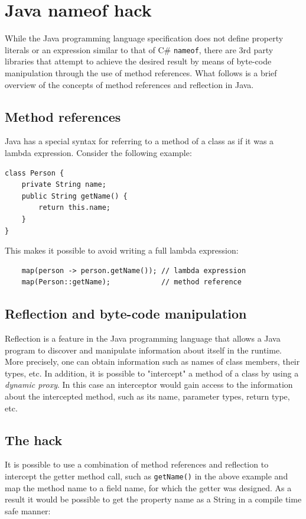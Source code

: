 \section{Java nameof hack}
While the Java programming language specification does not define property literals or an expression similar to that of C\# \texttt{nameof}, there are 3rd party libraries \cite{nameof-strange} \cite{nameof-mobius} that attempt to achieve the desired result by means of byte-code manipulation through the use of method references. What follows is a brief overview of the concepts of method references and reflection in Java.

\subsection{Method references}
Java has a special syntax for referring to a method of a class as if it was a lambda expression. Consider the following example: 

\begin{verbatim}
class Person {
    private String name;
    public String getName() {
        return this.name;
    }
}
\end{verbatim}

This makes it possible to avoid writing a full lambda expression:
\begin{verbatim}
    map(person -> person.getName()); // lambda expression
    map(Person::getName);            // method reference
\end{verbatim}

\subsection{Reflection and byte-code manipulation}
Reflection is a feature in the Java programming language that allows a Java program to discover and manipulate information about itself in the runtime. More precisely, one can obtain information such as names of class members, their types, etc. In addition, it is possible to "intercept" a method of a class by using a \textit{dynamic proxy}. In this case an interceptor would gain access to the information about the intercepted method, such as its name, parameter types, return type, etc.

\subsection{The hack}
It is possible to use a combination of method references and reflection to intercept the getter method call, such as \texttt{getName()} in the above example and map the method name to a field name, for which the getter was designed. As a result it would be possible to get the property name as a String in a compile time safe manner:

